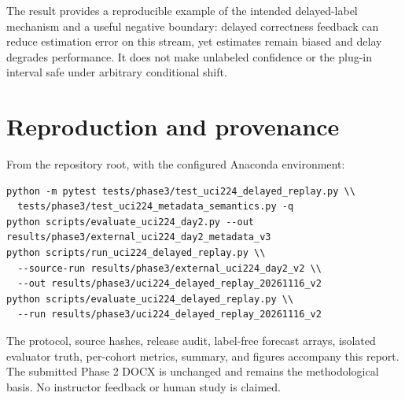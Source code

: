 \documentclass[10pt,a4paper]{article}
\begin{document}
The result provides a reproducible example of the intended delayed-label mechanism and a useful negative boundary: delayed correctness feedback can reduce estimation error on this stream, yet estimates remain biased and delay degrades performance. It does not make unlabeled confidence or the plug-in interval safe under arbitrary conditional shift.

\section*{Reproduction and provenance}
From the repository root, with the configured Anaconda environment:
\begin{verbatim}
python -m pytest tests/phase3/test_uci224_delayed_replay.py \\
  tests/phase3/test_uci224_metadata_semantics.py -q
python scripts/evaluate_uci224_day2.py --out results/phase3/external_uci224_day2_metadata_v3
python scripts/run_uci224_delayed_replay.py \\
  --source-run results/phase3/external_uci224_day2_v2 \\
  --out results/phase3/uci224_delayed_replay_20261116_v2
python scripts/evaluate_uci224_delayed_replay.py \\
  --run results/phase3/uci224_delayed_replay_20261116_v2
\end{verbatim}
The protocol, source hashes, release audit, label-free forecast arrays, isolated evaluator truth, per-cohort metrics, summary, and figures accompany this report. The submitted Phase 2 DOCX is unchanged and remains the methodological basis. No instructor feedback or human study is claimed.
\end{document}
